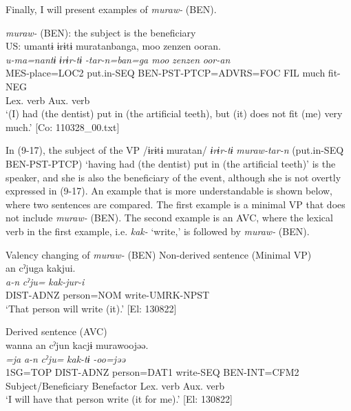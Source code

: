 Finally, I will present examples of \textit{muraw-} (BEN).

\ea   \textit{muraw-} (BEN): the subject is the beneficiary\label{ex:9.17}\\
\gllll  US:  umantɨ  ɨrɨtɨ  muratanbanga,  {\textbar}moo  zenzen{\textbar}  ooran.    \\
    \textit{u-ma=nantɨ}  \textit{ɨrɨr-tɨ}  \textit{-tar-n=ban=ga  moo}   \textit{zenzen}  \textit{oor-an}    \\
    MES-place=LOC2  put.in-SEQ  BEN-PST-PTCP=ADVRS=FOC  FIL   much  fit-NEG    \\
      Lex. verb  Aux. verb     \\
    \glt     ‘(I) had (the dentist) put in (the artificial teeth), but (it) does not fit (me) very much.’ [Co: 110328\_00.txt]
\z

In (9-17), the subject of the VP /ɨrɨtɨ muratan/ \textit{ɨrɨr-tɨ} \textit{muraw-tar-n} (put.in-SEQ BEN-PST-PTCP) ‘having had (the dentist) put in (the artificial teeth)’ is the speaker, and she is also the beneficiary of the event, although she is not overtly expressed in (9-17). An example that is more understandable is shown below, where two sentences are compared. The first example is a minimal VP that does not include \textit{muraw-} (BEN). The second example is an AVC, where the lexical verb in the first example, i.e. \textit{kak-} ‘write,’ is followed by \textit{muraw-} (BEN).

\ea   Valency changing of \textit{muraw-} (BEN) \label{ex:9.18}
  \ea Non-derived sentence (Minimal VP)\label{ex:9.18a}\\
\glll     an  cˀjuga  kakjui.\\
      \textit{a-n}  \textit{cˀju=}  \textit{kak-jur-i}\\
      DIST-ADNZ  person=NOM  write-UMRK-NPST\\
      \glt       ‘That person will write (it).’ [El: 130822]

  \ex  Derived sentence (AVC)\label{ex:9.18b}\\
      \gllll wanna  an  cˀjun  kacjɨ   murawoojəə.\\
      \textit{=ja}  \textit{a-n}  \textit{cˀju=}  \textit{kak-tɨ}      \textit{-oo=jəə}\\
      1SG=TOP  DIST-ADNZ  person=DAT1  write-SEQ   BEN-INT=CFM2\\
      Subject/Beneficiary Benefactor  Lex. verb  Aux. verb \\      
      \glt ‘I will have that person write (it for me).’       [El: 130822]
    \z
\z


